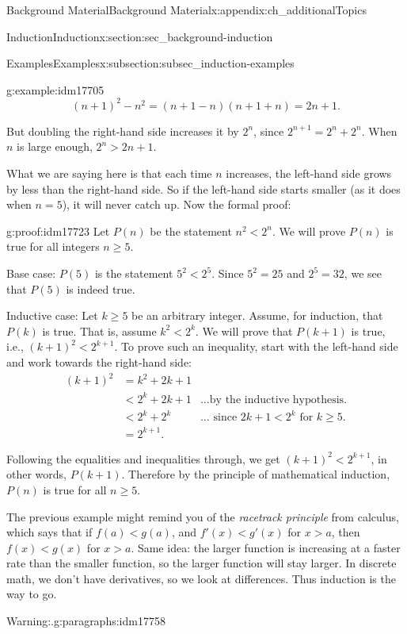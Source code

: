 \documentclass[oneside,10pt,]{book}
\numberwithin{equation}{chapter}
\newcommand{\lt}{<}
\newcommand{\amp}{&}
\begin{document}
\begin{appendixptx}{Background Material}{}{Background Material}{}{}{x:appendix:ch_additionalTopics}
\begin{sectionptx}{Induction}{}{Induction}{}{}{x:section:sec_background-induction}
\begin{subsectionptx}{Examples}{}{Examples}{}{}{x:subsection:subsec_induction-examples}
\begin{example}{}{g:example:idm17705}
\begin{equation*}
(n+1)^2 - n^2 = (n+1-n)(n+1+n) = 2n+1.
\end{equation*}
%
\par
But doubling the right-hand side increases it by \(2^n\), since \(2^{n+1} = 2^n + 2^n\). When \(n\) is large enough, \(2^n > 2n + 1\).%
\par
What we are saying here is that each time \(n\) increases, the left-hand side grows by less than the right-hand side. So if the left-hand side starts smaller (as it does when \(n = 5\)), it will never catch up. Now the formal proof:%
\begin{proofptx}{}{g:proof:idm17723}
Let \(P(n)\) be the statement \(n^2 \lt  2^n\). We will prove \(P(n)\) is true for all integers \(n \ge 5\).%
\par
Base case: \(P(5)\) is the statement \(5^2 \lt  2^5\). Since \(5^2 = 25\) and \(2^5 = 32\), we see that \(P(5)\) is indeed true.%
\par
Inductive case: Let \(k \ge 5\) be an arbitrary integer. Assume, for induction, that \(P(k)\) is true. That is, assume \(k^2 \lt  2^k\). We will prove that \(P(k+1)\) is true, i.e., \((k+1)^2 \lt  2^{k+1}\). To prove such an inequality, start with the left-hand side and work towards the right-hand side:%
\begin{align*}
(k+1)^2 \amp = k^2 + 2k + 1 \amp\\
\amp \lt 2^k + 2k + 1 \amp \ldots\text{by the inductive hypothesis.}\\
\amp \lt 2^k + 2^k \amp \ldots\text{ since } 2k + 1 \lt  2^k \text{ for }k \ge 5.\\
\amp = 2^{k+1}. \amp
\end{align*}
%
\par
Following the equalities and inequalities through, we get \((k+1)^2 \lt  2^{k+1}\), in other words, \(P(k+1)\). Therefore by the principle of mathematical induction, \(P(n)\) is true for all \(n \ge 5\).%
\end{proofptx}
\end{example}
The previous example might remind you of the \emph{racetrack principle} from calculus, which says that if \(f(a) \lt  g(a)\), and \(f'(x) \lt  g'(x)\) for \(x > a\), then \(f(x) \lt  g(x)\) for \(x > a\). Same idea: the larger function is increasing at a faster rate than the smaller function, so the larger function will stay larger. In discrete math, we don't have derivatives, so we look at differences. Thus induction is the way to go.%
\begin{paragraphs}{Warning:.}{g:paragraphs:idm17758}%

\end{paragraphs}
\end{subsectionptx}
\end{sectionptx}
\end{appendixptx}
\end{document}
